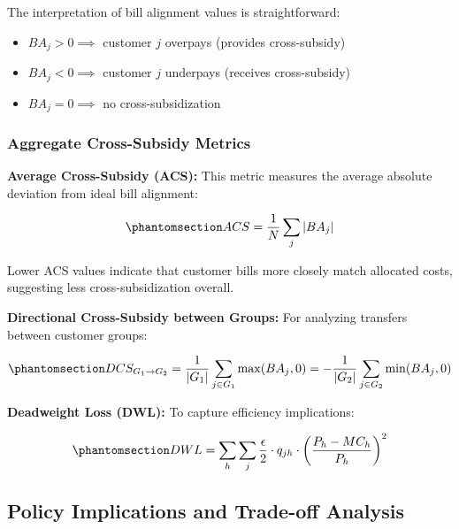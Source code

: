 \documentclass[
  11pt,
]{article}
\providecommand{\tightlist}{%
  \setlength{\itemsep}{0pt}\setlength{\parskip}{0pt}}
\begin{document}
The interpretation of bill alignment values is straightforward:

\begin{itemize}
\tightlist
\item
  \(BA_j > 0 \implies\) customer \(j\) overpays (provides cross-subsidy)
\item
  \(BA_j < 0 \implies\) customer \(j\) underpays (receives
  cross-subsidy)\\
\item
  \(BA_j = 0 \implies\) no cross-subsidization
\end{itemize}

\subsubsection{Aggregate Cross-Subsidy
Metrics}\label{aggregate-cross-subsidy-metrics}

\textbf{Average Cross-Subsidy (ACS):} This metric measures the average
absolute deviation from ideal bill alignment:

\begin{equation}\phantomsection\label{eq-acs}{ACS = \frac{1}{N} \sum_j |BA_j|}\end{equation}

Lower ACS values indicate that customer bills more closely match
allocated costs, suggesting less cross-subsidization overall.

\textbf{Directional Cross-Subsidy between Groups:} For analyzing
transfers between customer groups:

\begin{equation}\phantomsection\label{eq-dcs}{DCS_{G_1 \to G_2} = \frac{1}{|G_1|}\sum_{j \in G_1} \max(BA_j, 0) = -\frac{1}{|G_2|}\sum_{j \in G_2} \min(BA_j, 0)}\end{equation}

\textbf{Deadweight Loss (DWL):} To capture efficiency implications:

\begin{equation}\phantomsection\label{eq-dwl-bat}{DWL = \sum_h \sum_j \frac{\epsilon}{2} \cdot q_{jh} \cdot \left(\frac{P_h - MC_h}{P_h}\right)^2}\end{equation}

\subsection{Policy Implications and Trade-off
Analysis}\label{policy-implications-and-trade-off-analysis}
\end{document}

